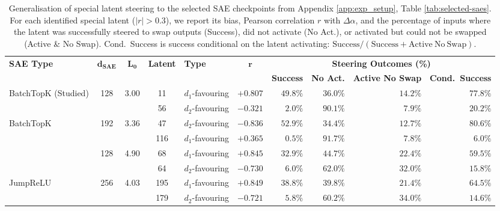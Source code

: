 \begin{table}[t]
\centering
\caption{Generalisation of special latent steering to the selected SAE checkpoints from Appendix \ref{app:exp_setup}, Table \ref{tab:selected-saes}. For each identified special latent ($|r| > 0.3$), we report its bias, Pearson correlation $r$ with $\Delta \alpha$, and the percentage of inputs where the latent was successfully steered to swap outputs (Success), did not activate (No Act.), or activated but could not be swapped (Active \& No Swap). Cond.\ Success is success conditional on the latent activating: $\mathrm{Success}/(\mathrm{Success}+\mathrm{Active\ No\ Swap})$.}
\label{tab:steering_generalisation}
\scriptsize
\setlength{\tabcolsep}{2pt}
\begin{tabular}{l c c c l c rrrr}
\toprule
\multirow{2}{*}{\textbf{SAE Type}} & \multirow{2}{*}{$\boldsymbol{d_{\text{SAE}}}$} & \multirow{2}{*}{$\boldsymbol{L_0}$} & \multirow{2}{*}{\textbf{Latent}} & \multirow{2}{*}{\textbf{Type}} & \multirow{2}{*}{$\boldsymbol{r}$} & \multicolumn{4}{c}{\textbf{Steering Outcomes (\%)}} \\
\cmidrule(lr){7-10}
& & & & & & \textbf{Success} & \textbf{No Act.} & \textbf{Active No Swap} & \textbf{Cond.\ Success} \\
\midrule
\multirow{2}{*}{BatchTopK (Studied)} & \multirow{2}{*}{128} & \multirow{2}{*}{3.00} & 11 & $d_1$-favouring & $+0.807$ & $49.8\%$ & $36.0\%$ & $14.2\%$ & $77.8\%$ \\
& & & 56 & $d_2$-favouring & $-0.321$ & $2.0\%$ & $90.1\%$ & $7.9\%$ & $20.2\%$ \\
\midrule
\multirow{2}{*}{BatchTopK} & \multirow{2}{*}{192} & \multirow{2}{*}{3.36} & 47 & $d_2$-favouring & $-0.836$ & $52.9\%$ & $34.4\%$ & $12.7\%$ & $80.6\%$ \\
& & & 116 & $d_1$-favouring & $+0.365$ & $0.5\%$ & $91.7\%$ & $7.8\%$ & $6.0\%$ \\
\addlinespace
& \multirow{2}{*}{128} & \multirow{2}{*}{4.90} & 68 & $d_1$-favouring & $+0.845$ & $32.9\%$ & $44.7\%$ & $22.4\%$ & $59.5\%$ \\
& & & 64 & $d_2$-favouring & $-0.730$ & $6.0\%$ & $62.0\%$ & $32.0\%$ & $15.8\%$ \\
\midrule
\multirow{2}{*}{JumpReLU} & \multirow{2}{*}{256} & \multirow{2}{*}{4.03} & 195 & $d_1$-favouring & $+0.849$ & $38.8\%$ & $39.8\%$ & $21.4\%$ & $64.5\%$ \\
& & & 179 & $d_2$-favouring & $-0.721$ & $5.8\%$ & $60.2\%$ & $34.0\%$ & $14.6\%$ \\

\end{tabular}
\end{table}
